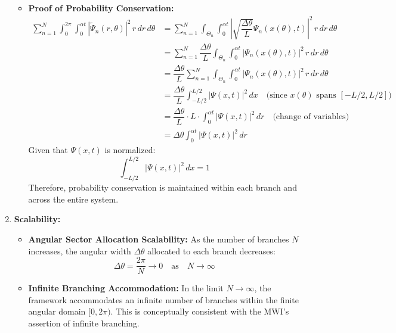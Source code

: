 \documentclass[12pt]{article}
\begin{document}
\begin{enumerate}
\begin{itemize}
        \item \textbf{Proof of Probability Conservation:}
        \begin{align*}
            \sum_{n=1}^{N} \int_{0}^{2\pi} \int_{0}^{\alpha t} |\tilde{\Psi}_n(r,\theta)|^2 \, r \, dr \, d\theta 
            &= \sum_{n=1}^{N} \int_{\Theta_n} \int_{0}^{\alpha t} \left| \sqrt{\dfrac{\Delta\theta}{L}} \Psi_n(x(\theta), t) \right|^2 \, r \, dr \, d\theta \\
            &= \sum_{n=1}^{N} \dfrac{\Delta\theta}{L} \int_{\Theta_n} \int_{0}^{\alpha t} |\Psi_n(x(\theta), t)|^2 \, r \, dr \, d\theta \\
            &= \dfrac{\Delta\theta}{L} \sum_{n=1}^{N} \int_{\Theta_n} \int_{0}^{\alpha t} |\Psi_n(x(\theta), t)|^2 \, r \, dr \, d\theta \\
            &= \dfrac{\Delta\theta}{L} \int_{-L/2}^{L/2} |\Psi(x,t)|^2 \, dx \quad \text{(since } x(\theta) \text{ spans } [-L/2, L/2]) \\
            &= \dfrac{\Delta\theta}{L} \cdot L \cdot \int_{0}^{\alpha t} |\Psi(x,t)|^2 \, dr \quad \text{(change of variables)} \\
            &= \Delta\theta \int_{0}^{\alpha t} |\Psi(x,t)|^2 \, dr
        \end{align*}
        Given that \(\Psi(x,t)\) is normalized:
        \[
        \int_{-L/2}^{L/2} |\Psi(x,t)|^2 \, dx = 1
        \]
        Therefore, probability conservation is maintained within each branch and across the entire system.
    \end{itemize}
    
    \item \textbf{Scalability:}
    \begin{itemize}
        \item \textbf{Angular Sector Allocation Scalability:}
        As the number of branches \(N\) increases, the angular width \(\Delta\theta\) allocated to each branch decreases:
        \[
        \Delta\theta = \dfrac{2\pi}{N} \rightarrow 0 \quad \text{as} \quad N \rightarrow \infty
        \]
        
        \item \textbf{Infinite Branching Accommodation:}
        In the limit \(N \rightarrow \infty\), the framework accommodates an infinite number of branches within the finite angular domain \([0, 2\pi)\). This is conceptually consistent with the MWI's assertion of infinite branching.
        

\end{itemize}
\end{enumerate}
\end{document}
